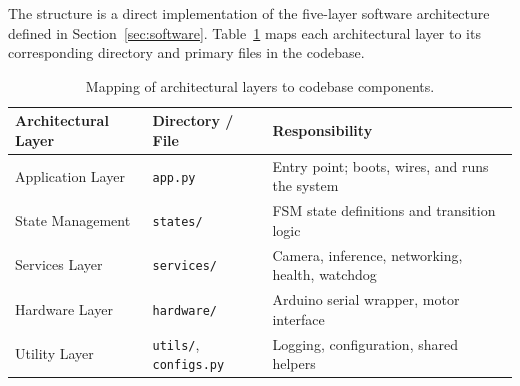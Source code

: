  
The structure is a direct implementation of the five-layer software
architecture defined in Section~\ref{sec:software}. Table~\ref{tab:layer_map}
maps each architectural layer to its corresponding directory and
primary files in the codebase.
 
\begin{table}[h]
\centering
\caption{Mapping of architectural layers to codebase components.}
\label{tab:layer_map}
\begin{tabular}{p{3cm} p{3.5cm} p{5cm}}
\hline
\textbf{Architectural Layer} & \textbf{Directory / File} & \textbf{Responsibility} \\
\hline
Application Layer   & \texttt{app.py}                 & Entry point; boots, wires, and runs the system \\
State Management    & \texttt{states/}                & FSM state definitions and transition logic \\
Services Layer      & \texttt{services/}              & Camera, inference, networking, health, watchdog \\
Hardware Layer      & \texttt{hardware/}              & Arduino serial wrapper, motor interface \\
Utility Layer       & \texttt{utils/}, \texttt{configs.py} & Logging, configuration, shared helpers \\
\hline
\end{tabular}
\end{table}
 

